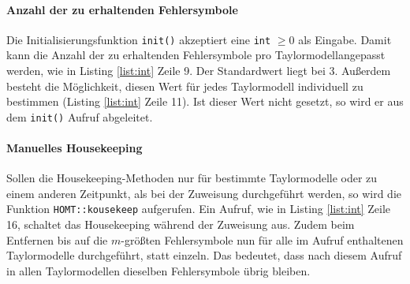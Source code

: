 \paragraph{Anzahl der zu erhaltenden Fehlersymbole}
Die Initialisierungsfunktion \verb+init()+ akzeptiert eine \verb+int+ $\geq 0$ als Eingabe. Damit kann die Anzahl der zu erhaltenden Fehlersymbole pro Taylormodellangepasst werden, wie in  Listing \ref{list:int} Zeile 9. Der Standardwert liegt bei 3. Außerdem besteht die Möglichkeit, diesen Wert für jedes Taylormodell individuell zu bestimmen (Listing \ref{list:int} Zeile 11). Ist dieser Wert nicht gesetzt, so wird er aus dem \verb+init()+ Aufruf abgeleitet.

\paragraph{Manuelles Housekeeping}
 Sollen die Housekeeping-Methoden nur für bestimmte Taylormodelle oder zu einem anderen Zeitpunkt, als bei der Zuweisung durchgeführt werden, so wird die Funktion \verb+HOMT::kousekeep+ aufgerufen. Ein Aufruf, wie in Listing \ref{list:int} Zeile 16, schaltet das Housekeeping während der Zuweisung aus. Zudem beim Entfernen bis auf die $m$-größten Fehlersymbole nun für alle im Aufruf enthaltenen Taylormodelle durchgeführt, statt einzeln. Das bedeutet, dass nach diesem Aufruf in allen Taylormodellen dieselben Fehlersymbole übrig bleiben.
 
 
 
